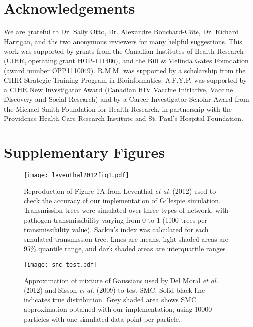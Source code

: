 \documentclass[12pt]{article}\usepackage[]{graphicx}\usepackage[]{color}
\newcommand{\add}[1]{\color{blue} \uline{#1} \color{black}}
\begin{document}
\section*{Acknowledgements}

\add{We are grateful to Dr. Sally Otto, Dr. Alexandre Bouchard-C\^ot\'e, 
Dr. Richard Harrigan, and the two anonymous reviewers for many helpful
suggestions.} This work was supported by grants from the Canadian Institutes of
Health Research (CIHR, operating grant HOP-111406), and the Bill \& Melinda
Gates Foundation (award number OPP1110049). R.M.M. was supported by a
scholarship from the CIHR Strategic Training Program in Bioinformatics.
A.F.Y.P. was supported by a CIHR New Investigator Award (Canadian HIV Vaccine
Initiative, Vaccine Discovery and Social Research) and by a Career Investigator
Scholar Award from the Michael Smith Foundation for Health Research, in
partnership with the Providence Health Care Research Institute and St. Paul's
Hospital Foundation.

\clearpage
\newpage
\printbibliography

\section*{Supplementary Figures}

\renewcommand{\thefigure}{S\arabic{figure}}
\setcounter{figure}{0}
\setcounter{page}{1}

\begin{figure}[ht]
  \centering
  \texttt{[image: leventhal2012fig1.pdf]}
  \caption{
    Reproduction of Figure 1A from Leventhal \textit{et al.} (2012) used to
    check the accuracy of our implementation of Gillespie simulation.
    Transmission trees were simulated over three types of network, with
    pathogen transmissibility varying from 0 to 1 (1000 trees per
    transmissibility value). Sackin's index was calculated for each simulated
    transmission tree. Lines are means, light shaded areas are 95\% quantile
    range, and dark shaded areas are interquartile ranges. 
    }
  \label{fig:leventhal}
\end{figure}

\begin{figure}[ht]
  \centering
  \texttt{[image: smc-test.pdf]}
  \caption{Approximation of mixture of Gaussians used by
    Del Moral \textit{et al.} (2012) and Sisson \textit{et al.} (2009) to test
    SMC. Solid black line indicates true distribution. Grey shaded area shows
    SMC approximation obtained with our implementation, using 10000
    particles with one simulated data point per particle.
  }
  \label{fig:smctest}
\end{figure}
\end{document}
